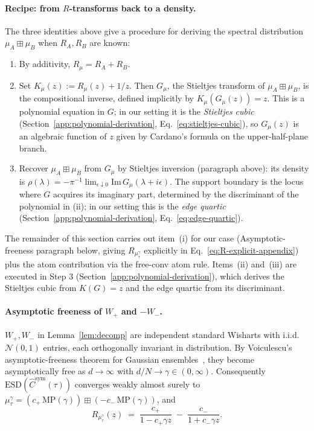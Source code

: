 \documentclass{article}
\begin{document}
\paragraph{Recipe: from $R$-transforms back to a density.}
The three identities above give a procedure for deriving the spectral
distribution $\mu_A \boxplus \mu_B$ when $R_A, R_B$ are known:
\begin{enumerate}[label=(\roman*),leftmargin=2.5em,nosep]
\item By additivity, $R_\mu = R_A + R_B$.
\item Set $K_\mu(z) := R_\mu(z) + 1/z$. Then $G_\mu$, the Stieltjes
transform of $\mu_A \boxplus \mu_B$, is the compositional inverse,
defined implicitly by $K_\mu(G_\mu(z)) = z$. This is a polynomial
equation in $G$; in our setting it is the \emph{Stieltjes cubic}
(Section~\ref{app:polynomial-derivation}, Eq.~\eqref{eq:stieltjes-cubic}),
so $G_\mu(z)$ is an algebraic function of $z$ given by Cardano's
formula on the upper-half-plane branch.
\item Recover $\mu_A \boxplus \mu_B$ from $G_\mu$ by Stieltjes
inversion (paragraph above): its density is
$\rho(\lambda) = -\pi^{-1}\lim_{\epsilon\downarrow 0}\mathrm{Im}\,G_\mu(\lambda+i\epsilon)$.
The support boundary is the locus where $G$ acquires its imaginary
part, determined by the discriminant of the polynomial in (ii);
in our setting this is the \emph{edge quartic}
(Section~\ref{app:polynomial-derivation}, Eq.~\eqref{eq:edge-quartic}).
\end{enumerate}
The remainder of this section carries out item~(i) for our case (Asymptotic-freeness paragraph below, giving $R_{\mu_\tau^\gamma}$ explicitly in Eq.~\eqref{eq:R-explicit-appendix}) plus the atom contribution via the free-conv atom rule. Items~(ii) and~(iii) are executed in Step 3 (Section~\ref{app:polynomial-derivation}), which derives the Stieltjes cubic from $K(G)=z$ and the edge quartic from its discriminant.

\paragraph{Asymptotic freeness of $W_+$ and $-W_-$.}
$W_+, W_-$ in Lemma~\ref{lem:decomp} are independent standard Wisharts with i.i.d.\ $\mathcal{N}(0, 1)$ entries, each orthogonally invariant in distribution. By Voiculescu's asymptotic-freeness theorem for Gaussian ensembles~\cite{voiculescu1992,nica2006}, they become
asymptotically free as $d\to\infty$ with $d/N \to \gamma \in (0, \infty)$.
Consequently $\mathrm{ESD}(\hat C^{\mathrm{sym}}(\tau))$ converges weakly almost surely to
$\mu_\tau^\gamma = (c_+\,\mathrm{MP}(\gamma)) \boxplus (-c_-\,\mathrm{MP}(\gamma))$,
and
\begin{equation}
R_{\mu_\tau^\gamma}(z) \;=\; \frac{c_+}{1 - c_+\gamma z} \;-\; \frac{c_-}{1 + c_-\gamma z}.
\label{eq:R-explicit-appendix}
\end{equation}
\end{document}
